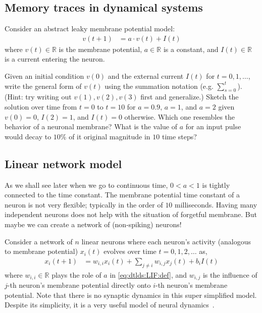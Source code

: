 \documentclass[a4paper,11pt]{exam}
\newcounter{ct}
\newcommand{\field}[1]{\ensuremath{\mathbb{#1}}}
\newcommand{\reals}{\field{R}}
\begin{document}
\subsection{Memory traces in dynamical systems}
Consider an abstract leaky membrane potential model:
\begin{align}\label{eq:dtlds:LIF:def}
	v(t+1) &= a \cdot v(t) + I(t)
\end{align}
where $v(t) \in \reals$ is the membrane potential, $a \in \reals$ is a constant, and $I(t) \in \reals$ is a current entering the neuron.

\begin{questions}
\question Given an initial condition $v(0)$ and the external current $I(t)$ for $t = 0, 1, \ldots $, write the general form of $v(t)$ using the summation notation (e.g. $\sum_{s=0}^t$). (Hint: try writing out $v(1), v(2), v(3)$ first and generalize.)
\question Sketch the solution over time from $t=0$ to $t=10$ for $a = 0.9$, $a = 1$, and $a = 2$ given $v(0) = 0$, $I(2) = 1$, and $I(t) = 0$ otherwise. Which one resembles the behavior of a neuronal membrane?
\question What is the value of $a$ for an input pulse would decay to $10\%$ of it original magnitude in $10$ time steps?

\newpage
\subsection{Linear network model}
As we shall see later when we go to continuous time, $0 < a < 1$ is tightly connected to the time constant.
The membrane potential time constant of a neuron is not very flexible; typically in the order of $10$ milliseconds.
Having many independent neurons does not help with the situation of forgetful membrane.
But maybe we can create a network of (non-spiking) neurons!

Consider a network of $n$ linear neurons where each neuron's activity (analogous to membrane potential) $x_i(t)$ evolves over time $t = 0, 1, 2, \ldots$ as,
\begin{align}\label{eq:dtlds:LDS}
	x_i(t+1) &= w_{i,i} x_i(t) + \sum_{j \neq i} w_{i,j} x_j(t) + b_i I(t)
\end{align}
where $w_{i,i} \in \reals$ plays the role of $a$ in \eqref{eq:dtlds:LIF:def}, and $w_{i,j}$ is the influence of $j$-th neuron's membrane potential directly onto $i$-th neuron's membrane potential.
Note that there is no synaptic dynamics in this super simplified model.
Despite its simplicity, it is a very useful model of neural dynamics~\citep{Druckmann2012,Ganguli2008,Goldman2009}.


\end{questions}
\end{document}

